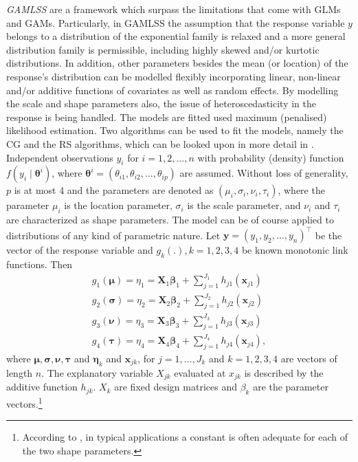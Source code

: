 
\textit{\ac{GAMLSS}} \citep{rigby2001gamlss, rigby2005generalized} are a framework which surpass the limitations that come with \acp{GLM} and \acp{GAM}. Particularly, in \ac{GAMLSS} the assumption that the response variable $y$ belongs to a distribution of the exponential family is relaxed and a more general distribution family is permissible, including highly skewed and/or kurtotic distributions. In addition, other parameters besides the mean (or location) of the response's distribution can be modelled flexibly incorporating linear, non-linear and/or additive functions of covariates as well as random effects. By modelling the scale and shape parameters also, the issue of heteroscedasticity in the response is being handled. The models are fitted used maximum (penalised) likelihood estimation. Two algorithms can be used to fit the models, namely the CG and the RS algorithms, which can be looked upon in more detail in \cite{rigby2005generalized}.
\\

Independent observations $y_i$ for $i=1,2,\ldots,n$ with probability (density) function $f\left(y_{i} \mid \boldsymbol{\theta}^{i}\right)$, where $\boldsymbol{\theta}^{i}=\left(\theta_{i 1}, \theta_{i 2}, \ldots, \theta_{i p}\right)$ are assumed. Without loss of generality, $p$ is at most 4 and the parameters are denoted as $\left(\mu_{i}, \sigma_{i}, \nu_{i}, \tau_{i}\right)$, where the parameter $\mu_i$ is the location parameter, $\sigma_i$ is the scale parameter, and $\nu_i$ and $\tau_i$ are characterized as shape parameters. The model can be of course applied to distributions of any kind of parametric nature. Let $\mathbf{y}=\left(y_{1}, y_{2}, \ldots, y_{n}\right)^{\top}$ be the vector of the response variable and $g_k(.), k = 1,2,3,4$ be known monotonic link functions. Then 
\begin{equation}
\begin{array}{l}
g_{1}(\boldsymbol{\mu})=\eta_{1}=\mathbf{X}_{1} \boldsymbol{\beta}_{1}+\sum\limits_{j=1}^{J_{1}} h_{j 1}\left(\mathbf{x}_{j 1}\right) \\
g_{2}(\boldsymbol{\sigma})=\eta_{2}=\mathbf{X}_{2} \boldsymbol{\beta}_{2}+\sum\limits_{j=1}^{J_{2}} h_{j 2}\left(\mathbf{x}_{j 2}\right) \\
g_{3}(\boldsymbol{\nu})=\eta_{3}=\mathbf{X}_{3} \boldsymbol{\beta}_{3}+\sum\limits_{j=1}^{J_{3}} h_{j 3}\left(\mathbf{x}_{j 3}\right) \\
g_{4}(\boldsymbol{\tau})=\eta_{4}=\mathbf{X}_{4} \boldsymbol{\beta}_{4}+\sum\limits_{j=1}^{J_{4}} h_{j 4}\left(\mathbf{x}_{j 4}\right),
\end{array}
\label{eq:gamlss_equations}
\end{equation}
where $\bm{\mu}, \bm{\sigma}, \bm{\nu}, \bm{\tau}$ and $\bm{\eta}_k$ and $\bm{x}_{jk}$, for $j=1,\ldots,J_k$ and $k=1,2,3,4$ are vectors of length $n$. The explanatory variable $X_{jk}$ evaluated at $x_{jk}$ is described by the additive function $h_{jk}$. $X_k$ are fixed design matrices and $\beta_k$ are the parameter vectors.\footnote{According to \cite{stasinopoulos2007generalized}, in typical applications a constant is often adequate for each of the two shape parameters.}
\\

